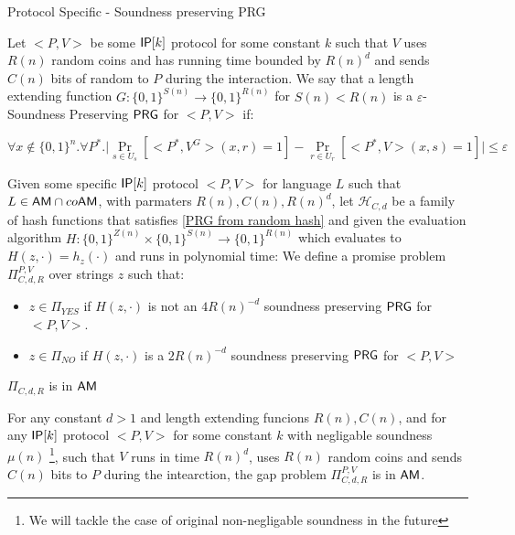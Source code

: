 \documentclass[11]{article}
\begin{document}
\begin{definition}{Protocol Specific - Soundness preserving PRG}

Let $<P,V>$  be some $\mathsf{IP}[k]$ protocol for some constant $k$ such that $V$ uses $R(n)$ random coins and has running time bounded by $R(n)^d$ and sends $C(n)$ bits of random to $P$ during the interaction. We say that a length extending function $G:\{0,1\}^{S(n)} \to \{0,1\}^{R(n)}$ for $S(n) < R(n)$ is a $\varepsilon$-Soundness Preserving $\mathsf{PRG}$ for $<P,V>$ if:

$$ \forall{x \notin \{0,1\}^n}. \forall{P^*}. \bigg|\Pr_{s \in U_s}[<P^*,V^G>(x, r) = 1] - \Pr_{r \in U_r}[<P^*, V>(x, s) = 1]\bigg| \leq \varepsilon$$
	
\end{definition}

Given some specific $\mathsf{IP}[k]$ protocol $<P,V>$ for language $L$ such that $L \in \mathsf{AM} \cap co\mathsf{AM}$, with parmaters $R(n), C(n), R(n)^d$,  let $\mathcal{H}_{C,d}$ be a family of hash functions that satisfies \ref{PRG from random hash} and given the evaluation algorithm $H: \{0,1\}^{Z(n)} \times \{0,1\}^{S(n)} \to \{0,1\}^{R(n)}$ which evaluates to $H(z, \cdot) = h_z(\cdot)$ and runs in polynomial time:
We define a promise problem $\Pi_{C,d,R}^{P,V}$ over strings $z$ such that:
\begin{itemize}
	\item $z \in \Pi_{YES}$ if $H(z, \cdot)$ is not an $4R(n)^{-d}$ soundness preserving $\mathsf{PRG}$ for $<P,V>$.
	\item $z \in \Pi_{NO}$ if $H(z, \cdot)$ is a $2R(n)^{-d}$ soundness preserving $\mathsf{PRG}$ for $<P,V>$
\end{itemize}

\begin{claim} {$\Pi_{C,d,R}$ is in $\mathsf{AM}$}

For any constant $d > 1$ and length extending funcions $R(n), C(n)$, and for any $\mathsf{IP}[k]$ protocol $<P,V>$ for some constant $k$ with negligable soundness $\mu(n)$ \footnote{We will tackle the case of original non-negligable soundness in the future}, such that $V$ runs in time $R(n)^d$, uses $R(n)$ random coins and sends $C(n)$ bits to $P$ during the intearction, the gap problem $\Pi_{C,d,R}^{P,V}$ is in $\mathsf{AM}$.

\end{claim}
\end{document}
